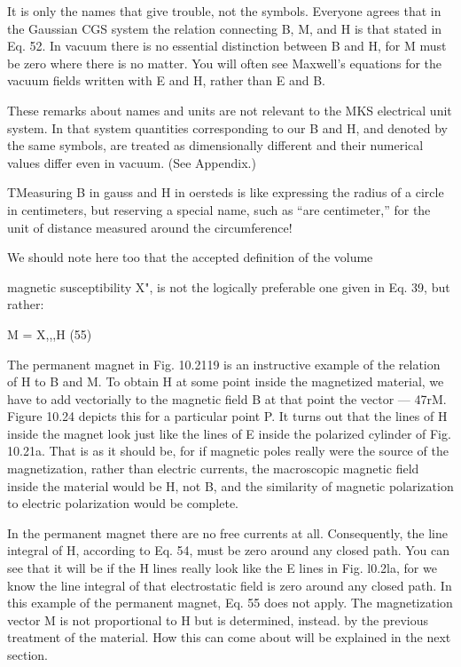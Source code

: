 {It is only the names that give trouble, not the symbols. Everyone
agrees that in the Gaussian CGS system the relation connecting B,
M, and H is that stated in Eq. 52. In vacuum there is no essential
distinction between B and H, for M must be zero where there is no
matter. You will often see Maxwell's equations for the vacuum fields
written with E and H, rather than E and B.

These remarks about names and units are not relevant to the MKS
electrical unit system. In that system quantities corresponding to
our B and H, and denoted by the same symbols, are treated as
dimensionally different and their numerical values differ even in
vacuum. (See Appendix.)

TMeasuring B in gauss and H in oersteds is like expressing the radius of a circle in
centimeters, but reserving a special name, such as ``are centimeter,'' for the unit of distance
measured around the circumference!

We should note here too that the accepted definition of the volume

magnetic susceptibility X", is not the logically preferable one given
in Eq. 39, but rather:
\begin{equation}
\end{equation}

M = X,,,H (55)

The permanent magnet in Fig. 10.2119 is an instructive example
of the relation of H to B and M. To obtain H at some point inside
the magnetized material, we have to add vectorially to the magnetic
field B at that point the vector  --- 47rM. Figure 10.24 depicts this
for a particular point P. It turns out that the lines of H inside the
magnet look just like the lines of E inside the polarized cylinder of
Fig. 10.21a. That is as it should be, for if magnetic poles really were
the source of the magnetization, rather than electric currents, the
macroscopic magnetic field inside the material would be H, not B,
and the similarity of magnetic polarization to electric polarization
would be complete.

In the permanent magnet there are no free currents at all. 
Consequently, the line integral of H, according to Eq. 54, must be zero
around any closed path. You can see that it will be if the H lines
really look like the E lines in Fig. l0.2la, for we know the line integral
of that electrostatic field is zero around any closed path. In this
example of the permanent magnet, Eq. 55 does not apply. The
magnetization vector M is not proportional to H but is determined,
instead. by the previous treatment of the material. How this can
come about will be explained in the next section.

}
